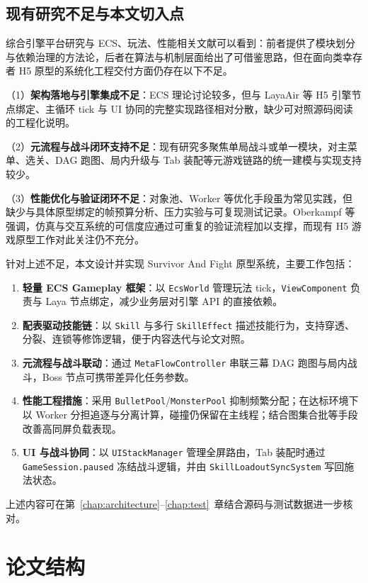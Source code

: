\subsection{现有研究不足与本文切入点}

综合引擎平台研究与 ECS、玩法、性能相关文献可以看到：前者提供了模块划分与依赖治理的方法论，后者在算法与机制层面给出了可借鉴思路，但在面向类幸存者 H5 原型的系统化工程交付方面仍存在以下不足。

（1）\textbf{架构落地与引擎集成不足}：ECS 理论讨论较多，但与 LayaAir 等 H5 引擎节点绑定、主循环 tick 与 UI 协同的完整实现路径相对分散，缺少可对照源码阅读的工程化说明。

（2）\textbf{元流程与战斗闭环支持不足}：现有研究多聚焦单局战斗或单一模块，对主菜单、选关、DAG 跑图、局内升级与 Tab 装配等元游戏链路的统一建模与实现支持较少。

（3）\textbf{性能优化与验证闭环不足}：对象池、Worker 等优化手段虽为常见实践，但缺少与具体原型绑定的帧预算分析、压力实验与可复现测试记录。Oberkampf 等强调，仿真与交互系统的可信度应通过可重复的验证流程加以支撑\cite{oberkampf2010vv}，而现有 H5 游戏原型工作对此关注仍不充分。

针对上述不足，本文设计并实现 Survivor And Fight 原型系统，主要工作包括：
\begin{enumerate}[label=(\arabic*)]
  \item \textbf{轻量 ECS Gameplay 框架}：以 \texttt{EcsWorld} 管理玩法 tick，\texttt{ViewComponent} 负责与 Laya 节点绑定，减少业务层对引擎 API 的直接依赖。
  \item \textbf{配表驱动技能链}：以 \texttt{Skill} 与多行 \texttt{SkillEffect} 描述技能行为，支持穿透、分裂、连锁等修饰逻辑，便于内容迭代与论文对照。
  \item \textbf{元流程与战斗联动}：通过 \texttt{MetaFlowController} 串联三幕 DAG 跑图与局内战斗，Boss 节点可携带差异化任务参数。
  \item \textbf{性能工程措施}：采用 \texttt{BulletPool}/\texttt{MonsterPool} 抑制频繁分配；在达标环境下以 Worker 分担追逐与分离计算，碰撞仍保留在主线程；结合图集合批等手段改善高同屏负载表现。
  \item \textbf{UI 与战斗协同}：以 \texttt{UIStackManager} 管理全屏路由，Tab 装配时通过 \texttt{GameSession.paused} 冻结战斗逻辑，并由 \texttt{SkillLoadoutSyncSystem} 写回施法状态。
\end{enumerate}

上述内容可在第~\ref{chap:architecture}--\ref{chap:test}~章结合源码与测试数据进一步核对。

\section{论文结构}

